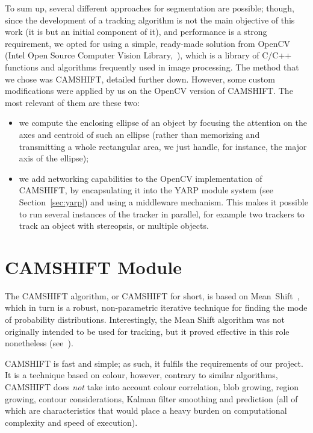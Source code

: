 \bigskip

To sum up, several different approaches for segmentation are possible; though, since the development of a tracking algorithm is not the main objective of this work (it is but an initial component of it), and performance is a strong requirement, we opted for using a simple, ready-made solution from OpenCV (Intel Open Source Computer Vision Library,~\cite{link:opencv}), which is a library of C/C++ functions and algorithms frequently used in image processing. The method that we chose was \ac{CAMSHIFT}, detailed further down. However, some custom modifications were applied by us on the OpenCV version of \ac{CAMSHIFT}. The most relevant of them are these two: 
\begin{itemize}
\item we compute the enclosing ellipse of an object by focusing the attention on the axes and centroid of such an ellipse (rather than memorizing and transmitting a whole rectangular area, we just handle, for instance, the major axis of the ellipse);

\item we add networking capabilities to the OpenCV implementation of \ac{CAMSHIFT}, by encapsulating it into the \ac{YARP} module system (see Section~\ref{sec:yarp}) and using a middleware mechanism. This makes it possible to run several instances of the tracker in parallel, for example two trackers to track an object with stereopsis, or multiple objects.
\end{itemize}

\section{\acs{CAMSHIFT} Module}
\label{sec:camshift_module}

The \acl{CAMSHIFT} algorithm, or \acs{CAMSHIFT} for short, is based on Mean~Shift~\cite{comaniciu:1997}, which in turn is a robust, non-parametric iterative technique for finding the mode of probability distributions. Interestingly, the Mean Shift algorithm was not originally intended to be used for tracking, but it proved effective in this role nonetheless (see~\cite{bradski:1998}).

\ac{CAMSHIFT} is fast and simple; as such, it fulfils the requirements of our project. It is a technique based on colour, however, contrary to similar algorithms, \ac{CAMSHIFT} does \emph{not} take into account colour correlation, blob growing, region growing, contour considerations, Kalman filter smoothing and prediction (all of which are characteristics that would place a heavy burden on computational complexity and speed of execution).

